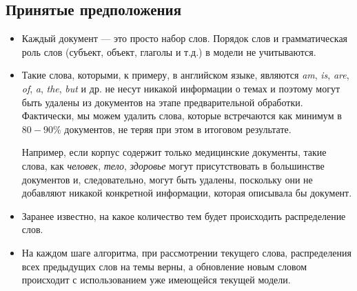 \subsection{Принятые предположения}

\begin{itemize}
\item Каждый документ --- это просто набор слов. Порядок слов и грамматическая роль слов (субъект, объект, глаголы и т.д.) в модели не учитываются.

\item Такие слова, которыми, к примеру, в английском языке, являются \textit{am}, \textit{is}, \textit{are},  \textit{of}, \textit{a}, \textit{the}, \textit{but} и др. не несут никакой информации о темах и поэтому могут быть удалены из документов на этапе предварительной обработки. Фактически, мы можем удалить слова, которые встречаются как минимум в $80-90 \%$ документов, не теряя при этом в итоговом результате.

Например, если корпус содержит только медицинские документы, такие слова, как \textit{человек}, \textit{тело}, \textit{здоровье} могут присутствовать в большинстве документов и, следовательно, могут быть удалены, поскольку они не добавляют никакой конкретной информации, которая описывала бы документ.

\item Заранее известно, на какое количество тем будет происходить распределение слов.

\item На каждом шаге алгоритма, при рассмотрении текущего слова, распределения всех предыдущих слов на темы верны, а обновление новым словом происходит с использованием уже имеющейся текущей модели.

\end{itemize}